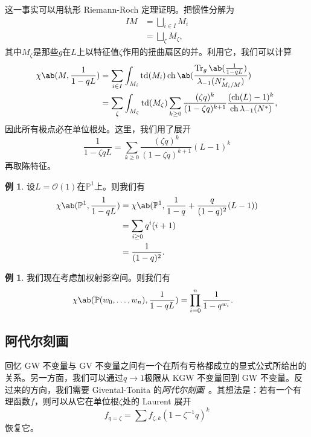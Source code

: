 \documentclass{amsart}
\theoremstyle{definition}
\newtheorem{exm}[thm]{例}
\theoremstyle{remark}
\theoremstyle{plain}
\theoremstyle{definition}
\theoremstyle{remark}
\renewcommand{\P}{\mathbb{P}}
\newcommand{\mc}[1]{\mathcal{#1}}
\newcommand{\on}[1]{\operatorname{#1}}
\newcommand{\1}{\mathbf{1}}
\newcommand{\2}{\mathbf{2}}
\newcommand{\3}{\mathbf{3}}
\DeclareMathOperator{\ch}{ch}
\begin{document}
这一事实可以用轨形 Riemann-Roch 定理证明。把惯性分解为
\begin{align*}
    IM &= \bigsqcup_{i \in I} M_i \\
    &= \bigsqcup_{\zeta} M_{\zeta},
\end{align*}
其中\(M_{\zeta}\)是那些\(g\)在\(L\)上以特征值\(\zeta\)作用的扭曲扇区的并。利用它，我们可以计算
\begin{align*}
    \chi\ab(M, \frac{1}{1-qL}) &= \sum_{i \in I} \int_{M_i} \on{td}(M_i) \on{ch} \ab(\frac{ \on{Tr}_g \ab(\frac{1}{1-qL}) }{\lambda_{-1}(N_{M_i/M}^*)}) \\
    &= \sum_{\zeta} \int_{M_{\zeta}} \on{td}(M_{\zeta}) \sum_{k \geq 0} \frac{(\zeta q)^k}{(1-\zeta q)^{k+1}} \frac{( \on{ch}(L)-1 )^k}{\ch \lambda_{-1}(N^*)},
\end{align*}
因此所有极点必在单位根处。这里，我们用了展开
\[ \frac{1}{1-\zeta q L} = \sum_{k \geq 0} \frac{(\zeta q)^k}{(1-\zeta q)^{k+1}} (L-1)^k \]
再取陈特征。

\begin{exm}
    设\(L = \mc{O}(1)\)在\(\P^1\)上。则我们有
    \begin{align*}
        \chi\ab(\P^1, \frac{1}{1-qL}) &= \chi\ab(\P^1, \frac{1}{1-q} + \frac{q}{(1-q)^2}(L-1)) \\
        &= \sum_{i \geq 0} q^i (i+1) \\
        &= \frac{1}{(1-q)^2}.
    \end{align*}
\end{exm}

\begin{exm}
    我们现在考虑加权射影空间。则我们有
    \begin{align*}
        \chi\ab(\P(w_0, \ldots, w_n), \frac{1}{1-qL}) &= \prod_{i=0}^n \frac{1}{1-q^{w_i}}. 
    \end{align*}
\end{exm}

\subsection{阿代尔刻画}%
\label{sub:Adelic characterization}

回忆 GW 不变量与 GV 不变量之间有一个在所有亏格都成立的显式公式所给出的关系。另一方面，我们可以通过\(q \to 1\)极限从 KGW 不变量回到 GW 不变量。反过来的方向，我们需要 Givental-Tonita 的\textit{阿代尔刻画}~\cite{GiventalTonita2014}。其想法是：若有一个有理函数\(f\)，则可以从它在单位根\(\zeta\)处的 Laurent 展开
\[ f_{q=\zeta} = \sum f_{\zeta, k} (1-\zeta^{-1} q)^k \]
恢复它。
\end{document}
